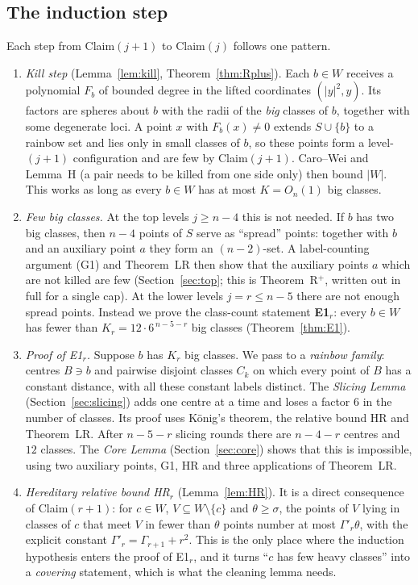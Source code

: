 \subsection{The induction step}
Each step from Claim$(j+1)$ to Claim$(j)$ follows one pattern.
\begin{enumerate}[label=(\roman*),leftmargin=2.2em]
\item \emph{Kill step} (Lemma~\ref{lem:kill}, Theorem~\ref{thm:Rplus}). Each $b\in W$ receives a
  polynomial $F_b$ of bounded degree in the lifted coordinates $(|y|^2,y)$. Its factors are spheres about $b$
  with the radii of the \emph{big} classes of $b$, together with some degenerate loci. A point $x$ with
  $F_b(x)\ne 0$ extends $S\cup\{b\}$ to a rainbow set and lies only in small classes of $b$, so these points
  form a level-$(j+1)$ configuration and are few by Claim$(j+1)$. Caro--Wei and Lemma~H (a pair needs to be
  killed from one side only) then bound $|W|$. This works as long as every $b\in W$ has at most $K=O_n(1)$ big
  classes.
\item \emph{Few big classes.} At the top levels $j\ge n-4$ this is not needed. If $b$ has two big classes, then
  $n-4$ points of $S$ serve as ``spread'' points: together with $b$ and an auxiliary point $a$ they form an
  $(n-2)$-set. A label-counting argument (G1) and Theorem~LR then show that the auxiliary points $a$ which are not
  killed are few (Section~\ref{sec:top}; this is Theorem~R$^+$, written out in full for a single cap). At the
  lower levels $j=r\le n-5$ there are not enough spread points. Instead we prove the class-count statement
  \textbf{E1$_r$}: every $b\in W$ has fewer than $K_r=12\cdot 6^{\,n-5-r}$ big classes (Theorem~\ref{thm:E1}).
\item \emph{Proof of E1$_r$.} Suppose $b$ has $K_r$ big classes. We pass to a \emph{rainbow family}: centres
  $B\ni b$ and pairwise disjoint classes $C_k$ on which every point of $B$ has a constant distance, with all
  these constant labels distinct. The \emph{Slicing Lemma} (Section~\ref{sec:slicing}) adds one centre at a time
  and loses a factor $6$ in the number of classes. Its proof uses K\"onig's theorem, the relative bound HR and
  Theorem~LR. After $n-5-r$ slicing rounds there are $n-4-r$ centres and $12$ classes. The \emph{Core Lemma}
  (Section~\ref{sec:core}) shows that this is impossible, using two auxiliary points, G1, HR and three applications
  of Theorem~LR.
\item \emph{Hereditary relative bound HR$_r$} (Lemma~\ref{lem:HR}). It is a direct consequence of
  Claim$(r+1)$: for $c\in W$, $V\subseteq W\setminus\{c\}$ and $\theta\ge\sigma$, the points of $V$ lying in
  classes of $c$ that meet $V$ in fewer than $\theta$ points number at most $\Gamma'_r\theta$, with the explicit
  constant $\Gamma'_r=\Gamma_{r+1}+r^2$. This is the only place where the induction hypothesis enters the
  proof of E1$_r$, and it turns ``$c$ has few heavy classes'' into a \emph{covering} statement, which is what the
  cleaning lemma needs.
\end{enumerate}

